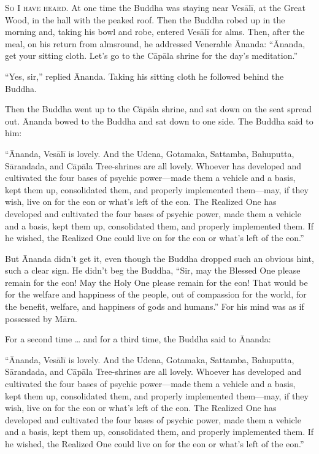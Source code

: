 \documentclass[12pt,openany]{book}%
\newcommand*{\scevam}[1]{\textsc{#1}}
\begin{document}
\scevam{So I have heard. }At one time the Buddha was staying near \textsanskrit{Vesālī}, at the Great Wood, in the hall with the peaked roof. Then the Buddha robed up in the morning and, taking his bowl and robe, entered \textsanskrit{Vesālī} for alms. Then, after the meal, on his return from almsround, he addressed Venerable Ānanda: “Ānanda, get your sitting cloth. Let’s go to the \textsanskrit{Cāpāla} shrine for the day’s meditation.” 

“Yes, sir,” replied Ānanda. Taking his sitting cloth he followed behind the Buddha. 

Then the Buddha went up to the \textsanskrit{Cāpāla} shrine, and sat down on the seat spread out. Ānanda bowed to the Buddha and sat down to one side. The Buddha said to him: 

“Ānanda, \textsanskrit{Vesālī} is lovely. And the Udena, Gotamaka, Sattamba, Bahuputta, \textsanskrit{Sārandada}, and \textsanskrit{Cāpāla} Tree-shrines are all lovely. Whoever has developed and cultivated the four bases of psychic power—made them a vehicle and a basis, kept them up, consolidated them, and properly implemented them—may, if they wish, live on for the eon or what’s left of the eon. The Realized One has developed and cultivated the four bases of psychic power, made them a vehicle and a basis, kept them up, consolidated them, and properly implemented them. If he wished, the Realized One could live on for the eon or what’s left of the eon.” 

But Ānanda didn’t get it, even though the Buddha dropped such an obvious hint, such a clear sign. He didn’t beg the Buddha, “Sir, may the Blessed One please remain for the eon! May the Holy One please remain for the eon! That would be for the welfare and happiness of the people, out of compassion for the world, for the benefit, welfare, and happiness of gods and humans.” For his mind was as if possessed by \textsanskrit{Māra}. 

For a second time … and for a third time, the Buddha said to Ānanda: 

“Ānanda, \textsanskrit{Vesālī} is lovely. And the Udena, Gotamaka, Sattamba, Bahuputta, \textsanskrit{Sārandada}, and \textsanskrit{Cāpāla} Tree-shrines are all lovely. Whoever has developed and cultivated the four bases of psychic power—made them a vehicle and a basis, kept them up, consolidated them, and properly implemented them—may, if they wish, live on for the eon or what’s left of the eon. The Realized One has developed and cultivated the four bases of psychic power, made them a vehicle and a basis, kept them up, consolidated them, and properly implemented them. If he wished, the Realized One could live on for the eon or what’s left of the eon.” 
\end{document}
